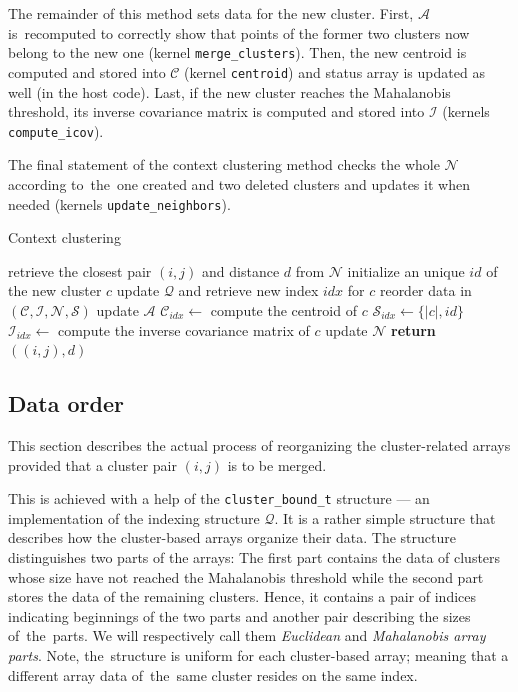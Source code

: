 \begin{description}
	The remainder of this method sets data for the new cluster. First, $\mathcal{A}$ is~recomputed to correctly show that points of the former two clusters now belong to the new one (kernel \texttt{merge\_clusters}). Then, the new centroid is computed and stored into $\mathcal{C}$ (kernel \texttt{centroid}) and status array is updated as well (in the host code). Last, if the new cluster reaches the Mahalanobis threshold, its inverse covariance matrix is computed and stored into $\mathcal{I}$ (kernels \texttt{compute\_icov}). 
	
	The final statement of the context clustering method checks the whole $\mathcal{N}$  according to~the~one created and two deleted clusters and updates it when needed (kernels \texttt{update\_neighbors}).
	
	\begin{algorithm}
	\caption{Context clustering}
	\label{alg03:context}
	\begin{algorithmic}[1]
		\State retrieve the closest pair $(i,j)$ and distance $d$ from $\mathcal{N}$
		\State initialize an unique $id$ of the new cluster $c$
		\State update $\mathcal{Q}$ and retrieve new index $idx$ for $c$
		\State reorder data in $(\mathcal{C},\mathcal{I},\mathcal{N},\mathcal{S})$
		\State update $\mathcal{A}$
		\State $\mathcal{C}_{idx} \gets$ compute the centroid of $c$
		\State $\mathcal{S}_{idx} \gets \{|c|, id\}$
		\State $\mathcal{I}_{idx} \gets$ compute the inverse covariance matrix of $c$
		\EndIf
		\State update $\mathcal{N}$
		\State \textbf{return} $((i,j),d)$
		\EndProcedure
	\end{algorithmic}
\end{algorithm}

\end{description}


\subsection{Data order}

This section describes the actual process of reorganizing the cluster-related arrays provided that a cluster pair $(i,j)$ is to be merged.

This is achieved with a help of the \texttt{cluster\_bound\_t} structure --- an implementation of the indexing structure $\mathcal{Q}$. It is a rather simple structure that describes how the cluster-based arrays organize their data. The structure distinguishes two parts of the arrays: The first part contains the data of clusters whose size have not reached the Mahalanobis threshold while the second part stores the data of the remaining clusters. Hence, it contains a pair of indices indicating beginnings of the two parts and another pair describing the sizes of~the~parts. We will respectively call them \emph{Euclidean} and \emph{Mahalanobis array parts}. Note, the~structure is uniform for each cluster-based array; meaning that a different array data of~the~same cluster resides on the same index.

